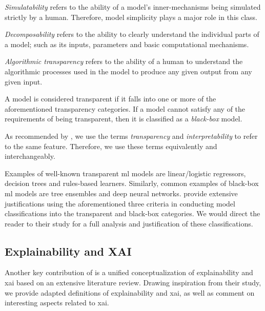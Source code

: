 \begin{remark}
  \textit{Simulatability} refers to the ability of a model's inner-mechanisms
  being simulated strictly by a human. Therefore, model simplicity plays a major
  role in this class.
\end{remark}

\begin{remark}
  \textit{Decomposability} refers to the ability to clearly understand the
  individual parts of a model; such as its inputs, parameters and basic
  computational mechanisms.
\end{remark}

\begin{remark}
  \textit{Algorithmic transparency} refers to the ability of a human to
  understand the algorithmic processes used in the model to produce any given
  output from any given input.
\end{remark}

\begin{remark}
  A model is considered transparent if it falls into one or more of the
  aforementioned transparency categories. If a model cannot satisfy any of the
  requirements of being transparent, then it is classified as a
  \textit{black-box} model.
\end{remark}

\begin{remark}
  \label{rmk:equivalence}
  As recommended by \citet[Page 3, Section 2.1]{arrieta2020explainable}, we use
  the terms \textit{transparency} and \textit{interpretability} to refer to the same feature.
  Therefore, we use these terms equivalently and interchangeably.
\end{remark}

Examples of well-known transparent \ac{ml} models are linear/logistic regressors,
decision trees and rules-based learners. Similarly, common examples of black-box
\ac{ml} models are tree ensembles and deep neural networks.
\citet{arrieta2020explainable} provide extensive justifications using the
aforementioned three criteria in conducting model classifications into the
transparent and black-box categories. We would direct the reader to their study
for a full analysis and justification of these classifications.

\subsection{Explainability and XAI}

Another key contribution of \citet{arrieta2020explainable} is a unified
conceptualization of explainability and \ac{xai} based on an extensive literature
review. Drawing inspiration from their study, we provide adapted definitions of
explainability and \ac{xai}, as well as comment on interesting aspects related to
\ac{xai}.


